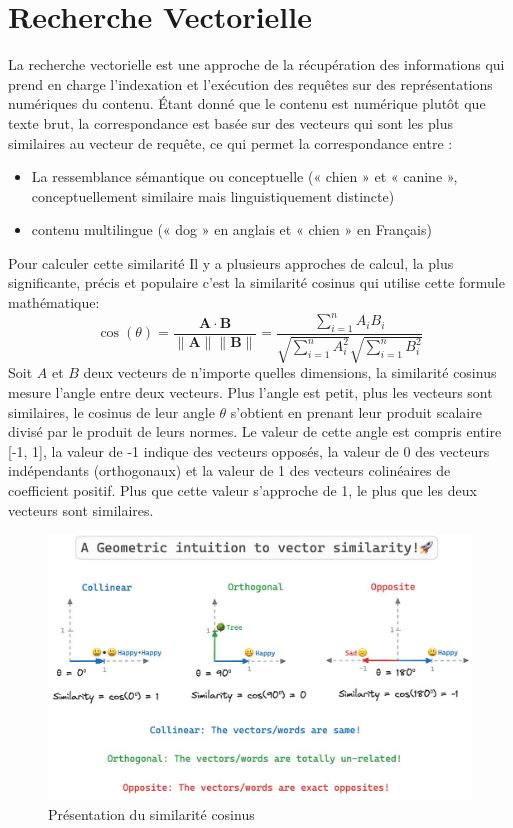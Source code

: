 \section{Recherche Vectorielle}
\noindent
La recherche vectorielle est une approche de la récupération des informations qui prend en charge l’indexation et l’exécution des requêtes sur des représentations numériques du contenu. Étant donné que le contenu est numérique plutôt que texte brut, la correspondance est basée sur des vecteurs qui sont les plus similaires au vecteur de requête, ce qui permet la correspondance entre :
\begin{itemize}
    \item La ressemblance sémantique ou conceptuelle (« chien » et « canine », conceptuellement similaire mais linguistiquement distincte)
    
    \item contenu multilingue (« dog » en anglais et « chien » en Français)
\end{itemize}

\noindent
Pour calculer cette similarité Il y a plusieurs approches de calcul, la plus significante, précis et populaire c'est la similarité cosinus qui utilise cette formule mathématique:
\[\cos(\theta) = \frac{\mathbf{A} \cdot \mathbf{B}}{\|\mathbf{A}\|\|\mathbf{B}\|} = \frac{\sum_{i=1}^{n} A_i B_i}{\sqrt{\sum_{i=1}^{n} A_i^2} \sqrt{\sum_{i=1}^{n} B_i^2}}
\]
Soit $A$ et $B$ deux vecteurs de n'importe quelles dimensions, la similarité cosinus mesure l'angle entre deux vecteurs. Plus l'angle est petit, plus les vecteurs sont similaires, le cosinus de leur angle $\theta$ s'obtient en prenant leur produit scalaire divisé par le produit de leurs normes. Le valeur de cette angle est compris entire [-1, 1], la valeur de -1 indique des vecteurs opposés, la valeur de 0 des vecteurs indépendants (orthogonaux) et la valeur de 1 des vecteurs colinéaires de coefficient positif. Plus que cette valeur s'approche de 1, le plus que les deux vecteurs sont similaires.

\begin{figure}[H]
\centering
\includegraphics[width=1\textwidth]{logos/cosine.png}
\caption{Présentation du similarité cosinus}
\label{fig:cosine}
\end{figure}

